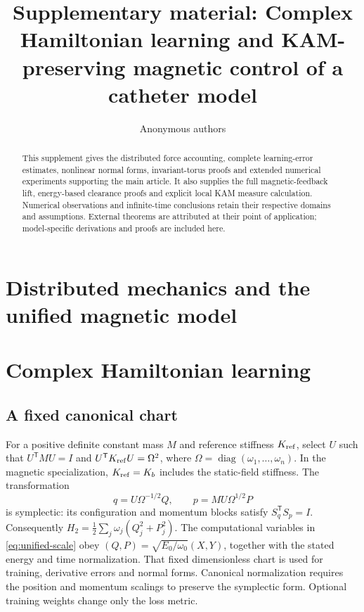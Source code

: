 \documentclass[doublespace,Afour,sageh,times]{sagej}
\theoremstyle{definition}
\newcommand{\diag}{\operatorname{diag}}
\begin{document}
\title{Supplementary material: Complex Hamiltonian learning and KAM-preserving magnetic control of a catheter model}
\author{Anonymous authors}
\begin{abstract}
This supplement gives the distributed force accounting, complete learning-error estimates, nonlinear normal forms, invariant-torus proofs and extended numerical experiments supporting the main article. It also supplies the full magnetic-feedback lift, energy-based clearance proofs and explicit local KAM measure calculation. Numerical observations and infinite-time conclusions retain their respective domains and assumptions. External theorems are attributed at their point of application; model-specific derivations and proofs are included here.
\end{abstract}
\maketitle
\raggedbottom
\section{Distributed mechanics and the unified magnetic model}
\label{sec:mechanics}


\section{Complex Hamiltonian learning}
\label{sec:learning}
\subsection{A fixed canonical chart}
For a positive definite constant mass $M$ and reference stiffness $K_{\rm ref}$, select $U$ such that $U^{\mathsf T}MU=I$ and $U^{\mathsf T}K_{\rm ref}U=\Omega^2$, where $\Omega=\diag(\omega_1,\ldots,\omega_n)$. In the magnetic specialization, $K_{\rm ref}=K_b$ includes the static-field stiffness. The transformation
\begin{equation}
 q=U\Omega^{-1/2}Q,\qquad p=MU\Omega^{1/2}P
 \label{eq:balancechart}
\end{equation}
is symplectic: its configuration and momentum blocks satisfy $S_q^{\mathsf T}S_p=I$. Consequently $H_2=\tfrac12\sum_j\omega_j(Q_j^2+P_j^2)$. The computational variables in \eqref{eq:unified-scale} obey $(Q,P)=\sqrt{E_0/\omega_0}(X,Y)$, together with the stated energy and time normalization. That fixed dimensionless chart is used for training, derivative errors and normal forms. Canonical normalization requires the position and momentum scalings to preserve the symplectic form. Optional training weights change only the loss metric.
\end{document}
